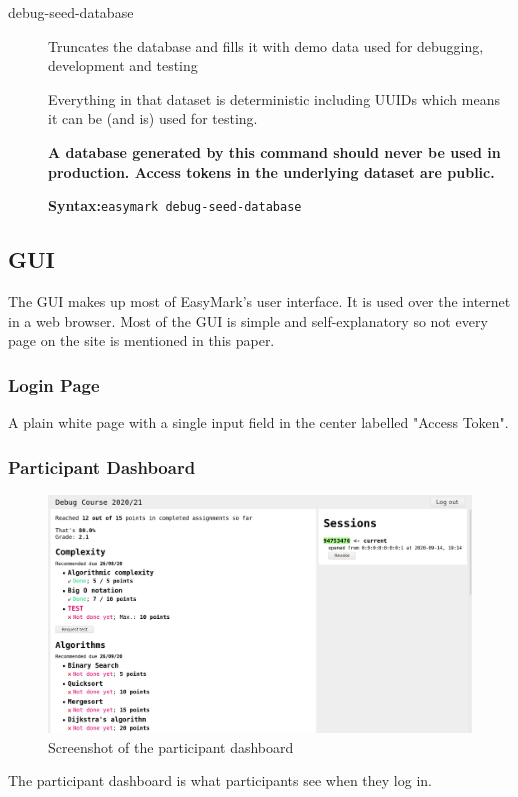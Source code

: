 \documentclass[12pt,a4paper,oneside]{report}
\begin{document}
\begin{description}
		\pagebreak
		\item[debug-seed-database] Truncates the database and fills it with demo data used for debugging, development and testing

		Everything in that dataset is deterministic including UUIDs which means it can be (and is) used for testing.

		\textbf{A database generated by this command should never be used in production. Access tokens in the underlying dataset are public.}

		\textbf{Syntax:}\tabto{75pt}\lstinline|easymark debug-seed-database|
	\end{description}

	\subsection{GUI}
	The GUI makes up most of EasyMark's user interface. It is used over the internet in a web browser. Most of the GUI is simple and self-explanatory so not every page on the site is mentioned in this paper.

	\subsubsection{Login Page}
	A plain white page with a single input field in the center labelled "Access Token".

	\subsubsection{Participant Dashboard}
	\begin{figure}[H]
		\includegraphics[width=\textwidth]{easymark_participant_dashboard.png}
		\vskip0pt
		\caption{Screenshot of the participant dashboard}
	\end{figure}
	The participant dashboard is what participants see when they log in.
\end{document}
